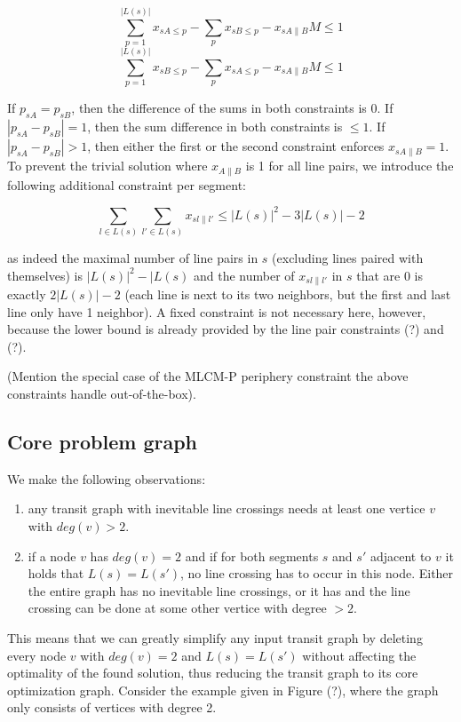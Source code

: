 \documentclass{llncs}
\begin{document}
$$\sum_{p=1}^{|L(s)|} x_{sA\leq p} - \sum_{p} x_{sB\leq p} - x_{sA\|B} M \leq 1$$
$$\sum_{p=1}^{|L(s)|} x_{sB\leq p} - \sum_{p} x_{sA\leq p} - x_{sA\|B} M \leq 1$$

If $p_{sA} = p_{sB}$, then the difference of the sums in both constraints is 0. If $|p_{sA} - p_{sB}| = 1$, then the sum difference in both constraints is $\leq 1$. If $|p_{sA} - p_{sB}| > 1$, then either the first or the second constraint enforces $x_{sA\|B} = 1$. To prevent the trivial solution where $x_{A\|B}$ is 1 for all line pairs, we introduce the following additional constraint per segment:

$$\sum_{l \in L(s)}\sum_{l' \in L(s)} x_{sl\|l'} \leq |L(s)|^2 - 3|L(s)| - 2$$

as indeed the maximal number of line pairs in $s$ (excluding lines paired with themselves) is $|L(s)|^2 - |L(s)$ and the number of $x_{sl\|l'}$ in $s$ that are 0 is exactly $2|L(s)| - 2$ (each line is next to its two neighbors, but the first and last line only have 1 neighbor). A fixed constraint is not necessary here, however, because the lower bound is already provided by the line pair constraints (?) and (?).

(Mention the special case of the MLCM-P periphery constraint the above constraints handle out-of-the-box).



%
\subsection{Core problem graph}
%

We make the following observations:

\begin{enumerate}
\item any transit graph with inevitable line crossings needs at least one vertice $v$ with $deg(v) > 2$.
\item if a node $v$ has $deg(v) = 2$ and if for both segments $s$ and $s'$ adjacent to $v$ it holds that $L(s) = L(s')$, no line crossing has to occur in this node. Either the entire graph has no inevitable line crossings, or it has and the line crossing can be done at some other vertice with degree $>2$.
\end{enumerate}

This means that we can greatly simplify any input transit graph by deleting every node $v$ with $deg(v) = 2$ and $L(s) = L(s')$ without affecting the optimality of the found solution, thus reducing the transit graph to its core optimization graph. Consider the example given in Figure (?), where the graph only consists of vertices with degree 2.
\end{document}
